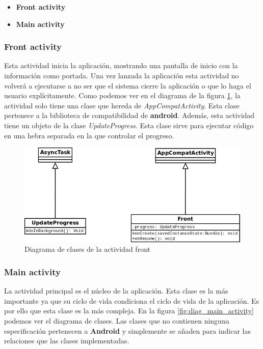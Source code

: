 \begin{itemize}
  \item \textbf{Front activity}
  \item \textbf{Main activity}
\end{itemize}

\subsubsection{Front activity}

Esta actividad inicia la aplicación, mostrando una pantalla de inicio con la información como portada. Una vez lanzada la aplicación esta actividad no volverá a ejecutarse a no ser que el sistema cierre la aplicación o que lo haga el usuario explícitamente. Como podemos ver en el diagrama de la figura \ref{fig:diag_front}, la actividad solo tiene una clase que hereda de \textit{AppCompatActivity}. Esta clase pertenece a la biblioteca de compatibilidad de \textbf{android}. Además, esta actividad tiene un objeto de la clase \textit{UpdateProgress}. Esta clase sirve para ejecutar código en una hebra separada en la que controlar el progreso.

\bigskip
\begin{figure}[!ht]
  \begin{center}
  \includegraphics[width=1\textwidth]{../images/front_diag.png}
  \caption{Diagrama de clases de la actividad front}
  \label{fig:diag_front}
  \end{center}
\end{figure}


\subsubsection{Main activity}

La actividad principal es el núcleo de la aplicación. Esta clase es la más importante ya que su ciclo de vida condiciona el ciclo de vida de la aplicación. Es por ello que esta clase es la más compleja. En la figura \ref{fig:diag_main_activity} podemos ver el diagrama de clases. Las clases que no contienen ninguna especificación pertenecen a \textbf{Android} y simplemente se añaden para indicar las relaciones que las clases implementadas.

